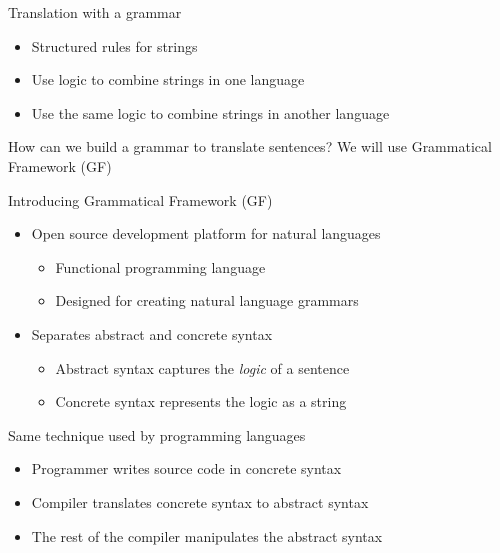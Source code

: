 \begin{frame}{Translation with a grammar} 
         \begin{itemize}
           \item Structured rules for strings \pause
           \item Use logic to combine strings in one language \pause
           \item Use the same logic to combine strings in another language \pause
         \end{itemize}
           \begin{block}{How can we build a grammar to translate sentences?}
              We will use Grammatical Framework (GF)
         \end{block}
\end{frame}
\begin{frame}{Introducing Grammatical Framework (GF)} 
         \begin{itemize}
           \item Open source development platform for natural languages \pause
           \begin{itemize}
              \item Functional programming language \pause
              \item Designed for creating natural language grammars
           \end{itemize}\pause
           \item Separates abstract and concrete syntax \pause
           \begin{itemize}
              \item Abstract syntax captures the \emph{logic} of a sentence \pause
              \item Concrete syntax represents the logic as a string
           \end{itemize}\pause
         \end{itemize}
         
           \begin{block}{Same technique used by programming languages}
             \begin{itemize}
               \item Programmer writes source code in concrete syntax \pause
               \item Compiler translates concrete syntax to abstract syntax \pause
               \item The rest of the compiler manipulates the abstract syntax
             \end{itemize}
         \end{block}
         
\end{frame}

